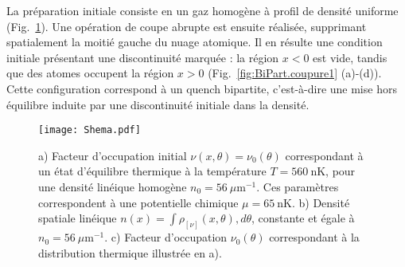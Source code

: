 La préparation initiale consiste en un gaz homogène à profil de densité uniforme (Fig.~\ref{fig:BiPart.insitut}). Une opération de coupe abrupte est ensuite réalisée, supprimant spatialement la moitié gauche du nuage atomique. Il en résulte une condition initiale présentant une discontinuité marquée : la région $x<0$ est vide, tandis que des atomes occupent la région $x>0$ (Fig.~\ref{fig:BiPart.coupure1} (a)-(d)). Cette configuration correspond à un quench bipartite, c’est-à-dire une mise hors équilibre induite par une discontinuité initiale dans la densité.

\begin{figure}[!htb]
	\centering
	\texttt{[image: Shema.pdf]}	
	\caption{a) Facteur d’occupation initial $\nu(x, \theta) = \nu_0(\theta)$ correspondant à un état d’équilibre thermique à la température $T = 560~\mathrm{nK}$, pour une densité linéique homogène $n_0 = 56~\mu\mathrm{m}^{-1}$. Ces paramètres correspondent à une potentielle chimique $\mu = 65~\mathrm{nK}$.
b) Densité spatiale linéique $n(x) = \int \rho_{[\nu]}(x, \theta), d\theta$, constante et égale à $n_0 = 56~\mu\mathrm{m}^{-1}$.
c) Facteur d’occupation $\nu_0(\theta)$ correspondant à la distribution thermique illustrée en a).}
	\label{fig:BiPart.insitut}
\end{figure}



			
			
					
